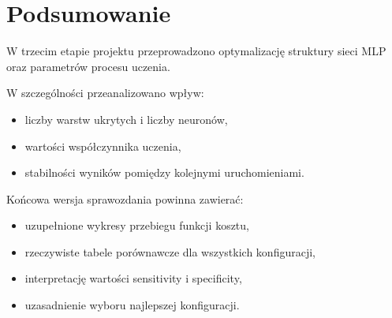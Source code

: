 \section{Podsumowanie}

W trzecim etapie projektu przeprowadzono optymalizację struktury sieci MLP
oraz parametrów procesu uczenia.

W szczególności przeanalizowano wpływ:
\begin{itemize}
    \item liczby warstw ukrytych i liczby neuronów,
    \item wartości współczynnika uczenia,
    \item stabilności wyników pomiędzy kolejnymi uruchomieniami.
\end{itemize}

Końcowa wersja sprawozdania powinna zawierać:
\begin{itemize}
    \item uzupełnione wykresy przebiegu funkcji kosztu,
    \item rzeczywiste tabele porównawcze dla wszystkich konfiguracji,
    \item interpretację wartości sensitivity i specificity,
    \item uzasadnienie wyboru najlepszej konfiguracji.
\end{itemize}
